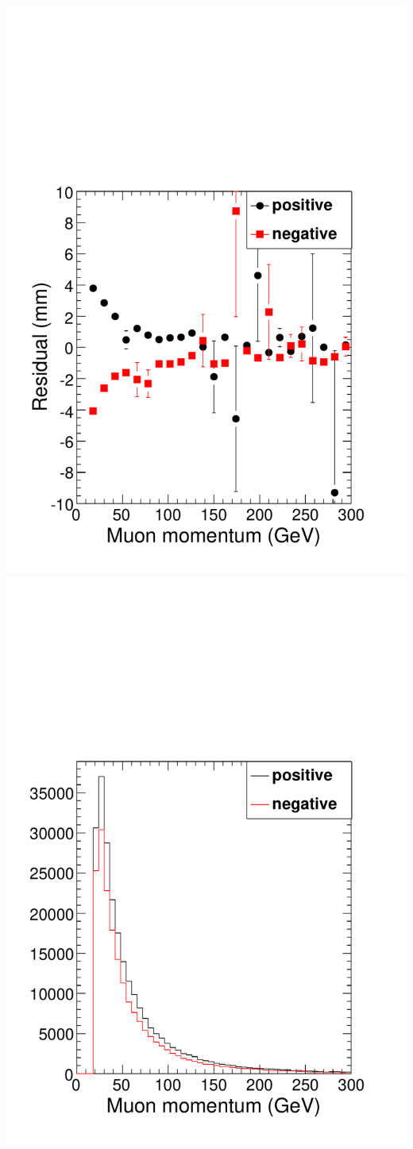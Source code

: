 \documentclass[compress]{beamer}
\begin{document}
\begin{frame}
\begin{center}
\includegraphics[height=4 cm]{demo_residual.pdf} \hspace{1 cm} \includegraphics[height=4 cm]{demo_momentum.pdf}
\end{center}
\end{frame}
\end{document}
